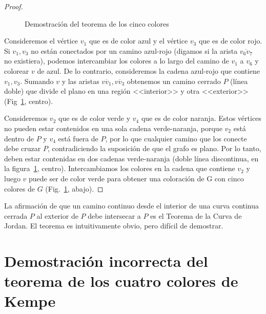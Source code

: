 \begin{proof}
\begin{figure}
\begin{center}
\end{center}
\caption{Demostración del teorema de los cinco colores}\label{f.five-color-proof}
\end{figure}

Consideremos el vértice $v_1$ que es de color azul y el vértice $v_3$ que es de color rojo. Si $v_1,v_3$ no están conectados por un camino azul-rojo (digamos si la arista $\overline{v_6v_7}$ no existiera), podemos intercambiar los colores a lo largo del camino de $v_1$ a $v_6$ y colorear $v$ de azul. De lo contrario, consideremos la cadena azul-rojo que contiene $v_1,v_3$. Sumando $v$ y las aristas $\overline{vv_1},\overline{vv_3}$ obtenemos un camino cerrado $P$ (línea doble) que divide el plano en una región <<interior>> y otra <<exterior>> (Fig~\ref{f.five-color-proof}, centro).

Consideremos $v_2$ que es de color verde y $v_4$ que es de color naranja. Estos vértices no pueden estar contenidos en una sola cadena verde-naranja, porque $v_2$ está dentro de $P$ y $v_4$ está fuera de $P$, por lo que cualquier camino que los conecte debe cruzar $P$, contradiciendo la suposición de que el grafo es plano. Por lo tanto, deben estar contenidas en dos cadenas verde-naranja (doble línea discontinua, en la figura~\ref{f.five-color-proof}, centro).
Intercambiamos los colores en la cadena que contiene $v_2$ y luego $v$ puede ser de color verde para obtener una coloración de G con cinco colores de $G$ (Fig.~\ref{f.five-color-proof}, abajo).
\end{proof}

\begin{advanced}
La afirmación de que un camino continuo desde el interior de una curva continua cerrada $P$ al exterior de $P$ debe intersecar a $P$ es el Teorema de la Curva de Jordan. El teorema es intuitivamente obvio, pero difícil de demostrar.
\end{advanced}


\section[Demostración incorrecta del teorema de los cuatro colores]
{Demostración incorrecta del teorema de los cuatro colores de Kempe}\label{s.kempe}


